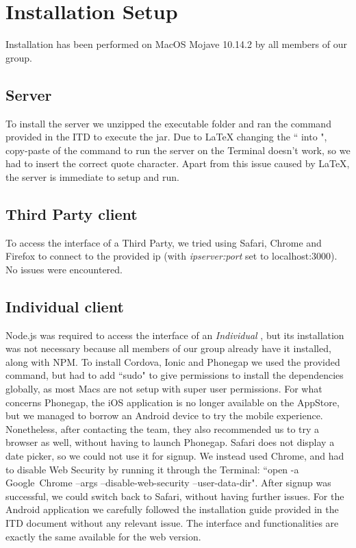 \documentclass[titlepage]{article}
\begin{document}
\pagebreak
\section{Installation Setup}
Installation has been performed on MacOS Mojave 10.14.2 by all members of our group.

\subsection{Server}
To install the server we unzipped the executable folder and ran the command provided in the ITD to execute the jar. \newline
Due to LaTeX changing the `` into ", copy-paste of the command to run the server on the Terminal doesn't work, so we had to insert the correct quote character. Apart from this issue caused by LaTeX, the server is immediate to setup and run.

\subsection{Third Party client}
To access the interface of a Third Party, we tried using Safari, Chrome and Firefox to connect to the provided ip (with {\it ipserver:port} set to localhost:3000). \newline
No issues were encountered.

\subsection{Individual client}
Node.js was required to access the interface of an {\it Individual} , but its installation was not necessary because all members of our group already have it installed, along with NPM. 
\newline
\newline
To install Cordova, Ionic and Phonegap we used the provided command, but had to add ``sudo" to give permissions to install the dependencies globally, as most Macs are not setup with super user permissions. \newline
\newline
For what concerns Phonegap, the iOS application is no longer available on the AppStore, but we managed to borrow an Android device to try the mobile experience. Nonetheless, after contacting the team, they also recommended us to try a browser as well, without having to launch Phonegap. \newline
Safari does not display a date picker, so we could not use it for signup. We instead used Chrome, and had to disable Web Security by running it through the Terminal: ``open -a Google\ Chrome --args --disable-web-security --user-data-dir". After signup was successful, we could switch back to Safari, without having further issues.
\newline
For the Android application we carefully followed the installation guide provided in the ITD document without any relevant issue. The interface and functionalities are exactly the same available for the web version.
\end{document}
